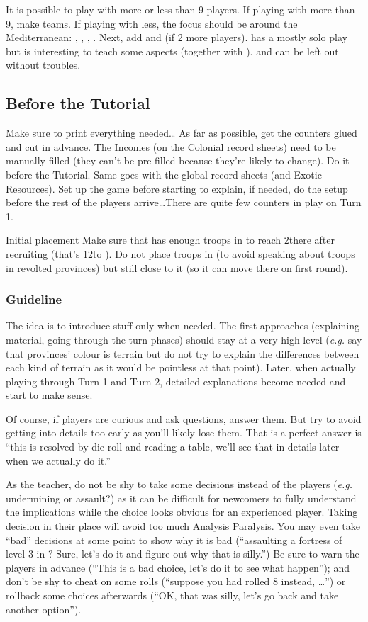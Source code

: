It is possible to play with more or less than 9 players. If playing with more
than 9, make teams. If playing with less, the focus should be around the
Mediterranean: \TUR, \VEN, \FRA, \HIS. Next, add \POL and \RUS (if 2 more
players). \POR has a mostly solo play but is interesting to teach some \ROTW
aspects (together with \HIS). \ANG and \DAN can be left out without troubles.

\subsection{Before the Tutorial}
\aparag Make sure to print everything needed\ldots
\bparag As far as possible, get the counters glued and cut in advance.
\bparag The \TradeFLEET Incomes (on the Colonial record sheets) need to be
manually filled (they can't be pre-filled because they're likely to
change). Do it before the Tutorial.
\bparag Same goes with the global record sheets (\TradeFLEET and Exotic
Resources).
\bparag Set up the game before starting to explain, if needed, do the setup
before the rest of the players arrive\ldots There are quite few counters in
play on Turn 1.

\aparag Initial placement
\bparag Make sure that \FRA has enough troops in \provinceProvence to reach
2\ARMY\faceplus there after recruiting (that's 12\MP to \villeNaples).
\bparag Do not place \HIS troops in \provinceCatalogne (to avoid speaking
about troops in revolted provinces) but still close to it (so it can move
there on first round).

\subsubsection{Guideline}
The idea is to introduce stuff only when needed. The first
approaches (explaining material, going through the turn phases) should stay at
a very high level (\emph{e.g.} say that provinces' colour is terrain but do
not try to explain the differences between each kind of terrain as it would be
pointless at that point). Later, when actually playing through Turn 1 and Turn
2, detailed explanations become needed and start to make sense.

Of course, if players are curious and ask questions, answer them. But try to
avoid getting into details too early as you'll likely lose them. That is a
perfect answer is ``this is resolved by die roll and reading a table, we'll
see that in details later when we actually do it.''

As the teacher, do not be shy to take some decisions instead of the players
(\emph{e.g.} undermining or assault?) as it can be difficult for newcomers to
fully understand the implications while the choice looks obvious for an
experienced player. Taking decision in their place will avoid too much
Analysis Paralysis. You may even take ``bad'' decisions at some point to show
why it is bad (``assaulting a fortress of level 3 in \TMED? Sure, let's do it
and figure out why that is silly.'') Be sure to warn the players in advance
(``This is a bad choice, let's do it to see what happen''); and don't be shy
to cheat on some rolls (``suppose you had rolled 8 instead, \ldots'') or
rollback some choices afterwards (``OK, that was silly, let's go back and take
another option'').

